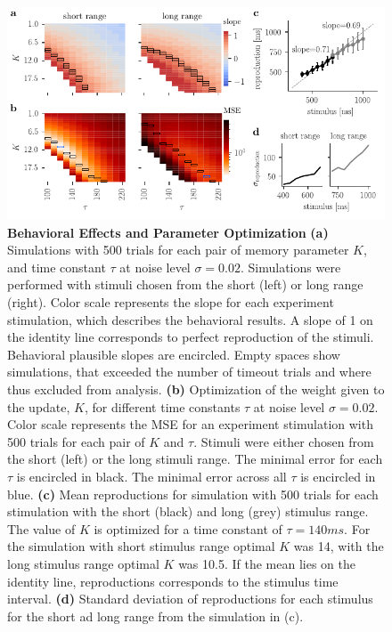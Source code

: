 \documentclass[10pt]{article}
\begin{document}
\begin{figure}[ht]
	\centering
	\includegraphics{figures/interIparams.pdf}
	\caption{\textbf{Behavioral Effects and Parameter Optimization} 
	\textbf{(a)} Simulations with 500 trials for each pair of memory parameter $K$, and time constant $\tau$ at noise level $\sigma = 0.02$. Simulations were performed with stimuli chosen from the short (left) or long range (right). Color scale represents the slope for each experiment stimulation, which describes the behavioral results. A slope of 1 on the identity line corresponds to perfect reproduction of the stimuli. Behavioral plausible slopes are encircled. Empty spaces show simulations, that exceeded the number of timeout trials and where thus excluded from analysis.
	\textbf{(b)} Optimization of the weight given to the update, $K$, for different time constants $\tau$ at noise level $\sigma = 0.02$. Color scale represents the MSE for an experiment stimulation with 500 trials for each pair of $K$ and $\tau$. Stimuli were either chosen from the short (left) or the long stimuli range. The minimal error for each $\tau$ is encircled in black. The minimal error across all $\tau$ is encircled in blue. 
	\textbf{(c)} Mean reproductions for simulation with 500 trials for each stimulation with the short (black) and long (grey) stimulus range. The value of $K$ is optimized for a time constant of $\tau = 140 ms$. For the simulation with short stimulus range optimal $K$ was 14, with the long stimulus range optimal $K$ was 10.5. If the mean lies on the identity line, reproductions corresponds to the stimulus time interval.  
	\textbf{(d)} Standard deviation of reproductions for each stimulus for the short ad long range from the simulation in (c).
	}
\label{fig:parameter}
\end{figure}
\end{document}
